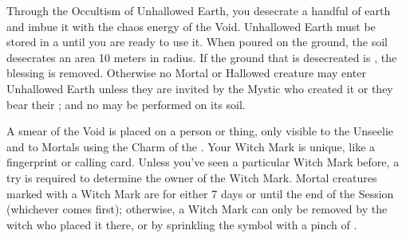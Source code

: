 \cbreak

\OCCULT[
  Name=Unhallowed Earth,
  Link=occultism-unhallowed-earth,
  Pips=2,
  Time=Days
]

Through the Occultism of Unhallowed Earth, you desecrate a handful of earth and imbue it with the chaos energy of the Void. Unhallowed Earth must be stored in a  until you are ready to use it. When poured on the ground, the soil desecrates an area 10 meters in radius. If the ground that is desecreated is , the blessing is removed. Otherwise no Mortal or Hallowed creature may enter Unhallowed Earth unless they are invited by the Mystic who created it or they bear their ; and no  may be performed on its soil.



\OCCULT[
  Name=Witch Mark,
  Link=occultism-witch-mark,
  Pips=1,
  Time=Days
]

A smear of the Void is placed on a person or thing, only visible to the Unseelie and to Mortals using the Charm of the . Your Witch Mark is unique, like a fingerprint or calling card. Unless you've seen a particular Witch Mark before, a  try is required to determine the owner of the Witch Mark. Mortal creatures marked with a Witch Mark are  for either 7 days or until the end of the Session (whichever comes first); otherwise, a Witch Mark can only be removed by the witch who placed it there, or by sprinkling the symbol with a pinch of .
